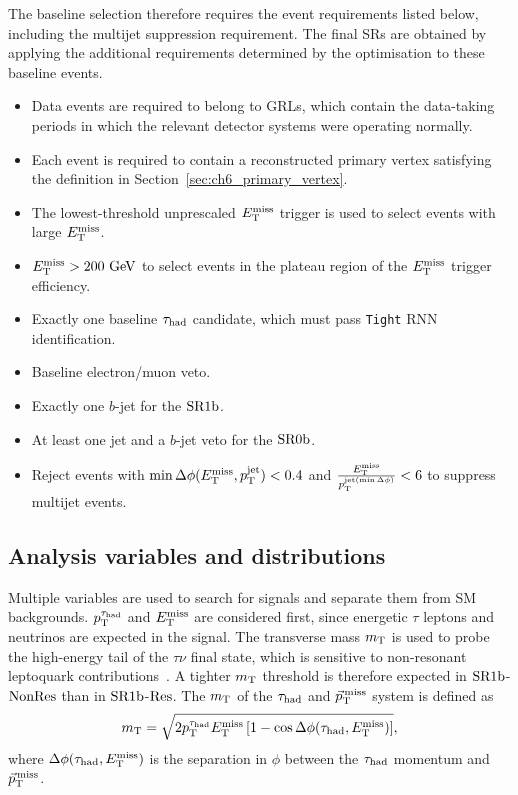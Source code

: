 The baseline selection therefore requires the event requirements listed below, including the multijet suppression requirement. The final SRs are obtained by applying the additional requirements determined by the optimisation to these baseline events.
\begin{itemize}[itemsep=0pt,parsep=0pt]
  \item Data events are required to belong to GRLs, which contain the data-taking periods in which the relevant detector systems were operating normally.
  \item Each event is required to contain a reconstructed primary vertex satisfying the definition in Section~\ref{sec:ch6_primary_vertex}.
  \item The lowest-threshold unprescaled $E_{\mathrm{T}}^{\mathrm{miss}}$ trigger is used to select events with large $E_{\mathrm{T}}^{\mathrm{miss}}$.
  \item $E_{\mathrm{T}}^{\mathrm{miss}}>200~\mathrm{GeV}$ to select events in the plateau region of the $E_{\mathrm{T}}^{\mathrm{miss}}$ trigger efficiency.
  \item Exactly one baseline $\tau_{\mathrm{had}}$ candidate, which must pass \texttt{Tight} RNN identification.
  \item Baseline electron/muon veto.
  \item Exactly one $b$-jet for the $\mathrm{SR1b}$.
  \item At least one jet and a $b$-jet veto for the $\mathrm{SR0b}$.
  \item Reject events with $\min\Delta\phi(E_{\mathrm{T}}^{\mathrm{miss}},p_{\mathrm{T}}^{\mathrm{jet}})<0.4$ and $\frac{E_{\mathrm{T}}^{\mathrm{miss}}}{p_{\mathrm{T}}^{\mathrm{jet}(\min{\Delta\phi)}}}<6$ to suppress multijet events.
\end{itemize}

\subsection{Analysis variables and distributions}
\label{subsec:ch7_variables}

Multiple variables are used to search for signals and separate them from SM backgrounds.
$p_{\mathrm{T}}^{\tau_{\mathrm{had}}}$ and $E_{\mathrm{T}}^{\mathrm{miss}}$ are considered first, since energetic $\tau$ leptons and neutrinos are expected in the signal.
The transverse mass $m_{\mathrm{T}}$ is used to probe the high-energy tail of the $\tau\nu$ final state, which is sensitive to non-resonant leptoquark contributions~\cite{Endo2022NonResonant}.
A tighter $m_{\mathrm{T}}$ threshold is therefore expected in $\mathrm{SR1b}$-$\mathrm{NonRes}$ than in $\mathrm{SR1b}$-$\mathrm{Res}$.
The $m_{\mathrm{T}}$ of the $\tau_{\mathrm{had}}$ and $\vec p_{\mathrm{T}}^{\,\mathrm{miss}}$ system is defined as
\begin{equation*}
    m_{\mathrm{T}} = \sqrt{2p_{\mathrm{T}}^{\tau_{\mathrm{had}}}E_{\mathrm{T}}^{\mathrm{miss}}\left[1-\cos\Delta\phi(\tau_{\mathrm{had}}, E_{\mathrm{T}}^{\mathrm{miss}})\right]},
\end{equation*}
where $\Delta\phi(\tau_{\mathrm{had}}, E_{\mathrm{T}}^{\mathrm{miss}})$ is the separation in $\phi$ between the $\tau_{\mathrm{had}}$ momentum and $\vec p_{\mathrm{T}}^{\,\mathrm{miss}}$.

